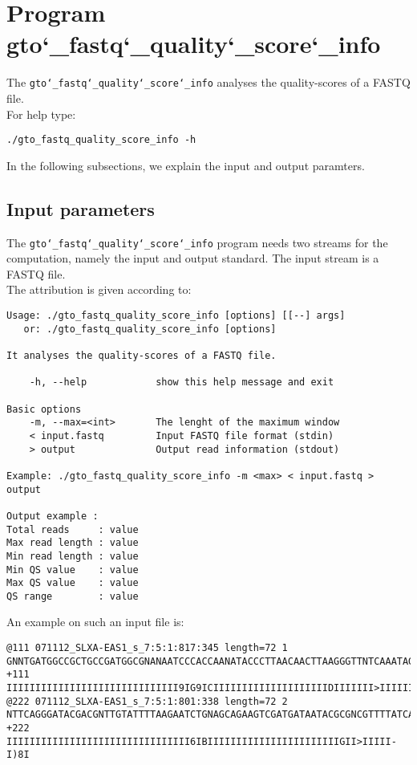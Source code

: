 \section{Program gto\char`_fastq\char`_quality\char`_score\char`_info}
The \texttt{gto\char`_fastq\char`_quality\char`_score\char`_info} analyses the quality-scores of a FASTQ file.\\
For help type:
\begin{lstlisting}
./gto_fastq_quality_score_info -h
\end{lstlisting}
In the following subsections, we explain the input and output paramters.

\subsection*{Input parameters}

The \texttt{gto\char`_fastq\char`_quality\char`_score\char`_info} program needs two streams for the computation, namely the input and output standard. The input stream is a FASTQ file.\\
The attribution is given according to:
\begin{lstlisting}
Usage: ./gto_fastq_quality_score_info [options] [[--] args]
   or: ./gto_fastq_quality_score_info [options]

It analyses the quality-scores of a FASTQ file.

    -h, --help            show this help message and exit

Basic options
    -m, --max=<int>       The lenght of the maximum window
    < input.fastq         Input FASTQ file format (stdin)
    > output              Output read information (stdout)

Example: ./gto_fastq_quality_score_info -m <max> < input.fastq > output

Output example :
Total reads     : value
Max read length : value
Min read length : value
Min QS value    : value
Max QS value    : value
QS range        : value
\end{lstlisting}
An example on such an input file is:
\begin{lstlisting}
@111 071112_SLXA-EAS1_s_7:5:1:817:345 length=72 1
GNNTGATGGCCGCTGCCGATGGCGNANAATCCCACCAANATACCCTTAACAACTTAAGGGTTNTCAAATAGA
+111
IIIIIIIIIIIIIIIIIIIIIIIIIIIIII9IG9ICIIIIIIIIIIIIIIIIIIIIDIIIIIII>IIIIII/
@222 071112_SLXA-EAS1_s_7:5:1:801:338 length=72 2
NTTCAGGGATACGACGNTTGTATTTTAAGAATCTGNAGCAGAAGTCGATGATAATACGCGNCGTTTTATCAN
+222
IIIIIIIIIIIIIIIIIIIIIIIIIIIIIIII6IBIIIIIIIIIIIIIIIIIIIIIIIGII>IIIII-I)8I
\end{lstlisting}

